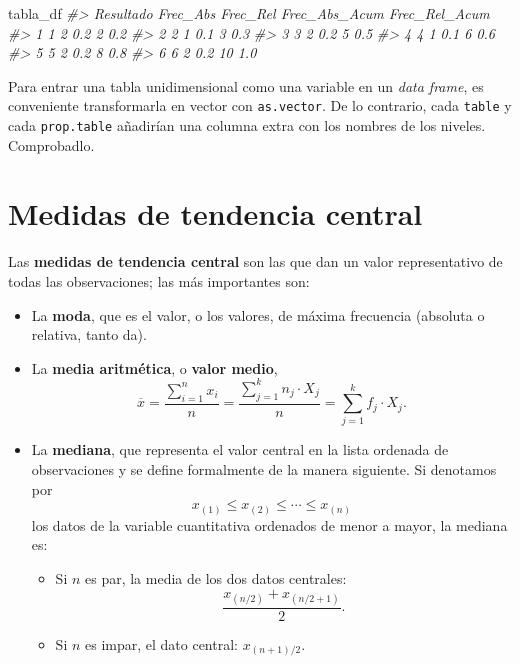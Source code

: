 \documentclass[
]{book}
\newenvironment{Shaded}{\begin{snugshade}}{\end{snugshade}}
\newcommand{\CommentTok}[1]{\textcolor[rgb]{0.56,0.35,0.01}{\textit{#1}}}
\newcommand{\NormalTok}[1]{#1}
\providecommand{\tightlist}{%
  \setlength{\itemsep}{0pt}\setlength{\parskip}{0pt}}
\theoremstyle{definition}
\theoremstyle{definition}
\theoremstyle{definition}
\theoremstyle{remark}
\begin{document}
\begin{Shaded}
\begin{Highlighting}[]
\NormalTok{tabla\_df}
\CommentTok{\#\textgreater{}   Resultado Frec\_Abs Frec\_Rel Frec\_Abs\_Acum Frec\_Rel\_Acum}
\CommentTok{\#\textgreater{} 1         1        2      0.2             2           0.2}
\CommentTok{\#\textgreater{} 2         2        1      0.1             3           0.3}
\CommentTok{\#\textgreater{} 3         3        2      0.2             5           0.5}
\CommentTok{\#\textgreater{} 4         4        1      0.1             6           0.6}
\CommentTok{\#\textgreater{} 5         5        2      0.2             8           0.8}
\CommentTok{\#\textgreater{} 6         6        2      0.2            10           1.0}
\end{Highlighting}
\end{Shaded}

Para entrar una tabla unidimensional como una variable en un \emph{data frame}, es conveniente transformarla en vector con \texttt{as.vector}. De lo contrario, cada \texttt{table} y cada \texttt{prop.table} añadirían una columna extra con los nombres de los niveles. Comprobadlo.

\hypertarget{medidas-de-tendencia-central}{%
\section{Medidas de tendencia central}\label{medidas-de-tendencia-central}}

Las \textbf{medidas de tendencia central} son las que dan un valor representativo de todas las observaciones; las más importantes son:

\begin{itemize}
\item
  La \textbf{moda}, que es el valor, o los valores, de máxima frecuencia (absoluta o relativa, tanto da).
\item
  La \textbf{media aritmética}, o \textbf{valor medio},
  \[
   \overline{x}=\frac{\sum_{i=1}^n x_i}{n}=\frac{\sum_{j=1}^k n_j\cdot X_j}{n}=
  \sum_{j=1}^k f_j\cdot X_j.
  \]
\item
  La \textbf{mediana}, que representa el valor central en la lista ordenada de observaciones y se define formalmente de la manera siguiente. Si denotamos por
  \[
  x_{(1)}\leqslant x_{(2)}\leqslant\cdots \leqslant x_{(n)}
  \]
  los datos de la variable cuantitativa ordenados de menor a mayor, la mediana es:

  \begin{itemize}
  \tightlist
  \item
    Si \(n\) es par, la media de los dos datos centrales:
    \[
    \frac{x_{(n/2)}+x_{(n/2+1)}}{2}.
    \]
  \item
    Si \(n\) es impar, el dato central: \(x_{(n+1)/2}\).
  \end{itemize}
\end{itemize}
\end{document}
